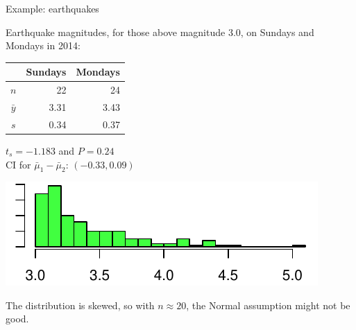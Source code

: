 %
\begin{frame}{Example: earthquakes}


  Earthquake magnitudes, for those above magnitude 3.0, on Sundays and Mondays in 2014:
  \begin{center}
    \begin{tabular}{crr}
       & Sundays & Mondays \\
       \hline
       $n$ & 22 & 24 \\
       $\bar y$ & 3.31 & 3.43 \\
       $s$ & 0.34 & 0.37
     \end{tabular}

   \vspace{2em}

   {$t_s=-1.183$ and $P=0.24$}\\
   CI for $\bar \mu_1 - \bar \mu_2$: $(-0.33,0.09)$
   \end{center}

   \pause 
   \begin{center}
     \includegraphics{quakes-mag-hist}
   \end{center}

   \alert{The distribution is skewed,} so with $n\approx 20$, the Normal assumption might not be good.

\end{frame}

